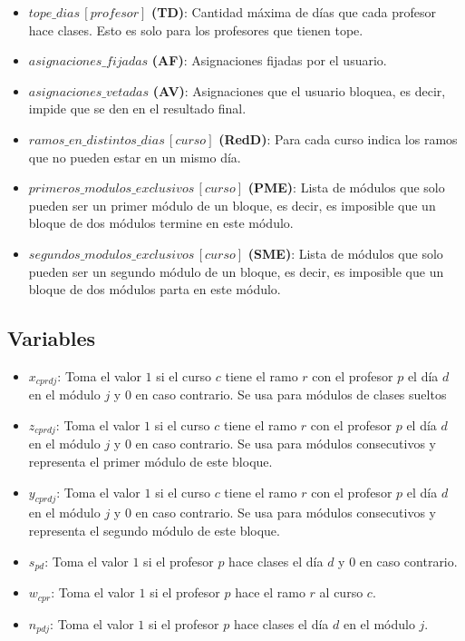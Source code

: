 \documentclass[letterpaper]{article}
\begin{document}
\begin{itemize}
    \item $tope\_dias\,[profesor]$ \textbf{(TD)}: Cantidad máxima de días que cada profesor hace clases. Esto es solo para los profesores que tienen tope.
    \item $asignaciones\_fijadas$ \textbf{(AF)}: Asignaciones fijadas por el usuario.
    \item $asignaciones\_vetadas$ \textbf{(AV)}: Asignaciones que el usuario bloquea, es decir, impide que se den en el resultado final.
    \item $ramos\_en\_distintos\_dias\,[curso]$ \textbf{(RedD)}: Para cada curso indica los ramos que no pueden estar en un mismo día. 
    \item $primeros\_modulos\_exclusivos\,[curso]$ \textbf{(PME)}: Lista de módulos que solo pueden ser un primer módulo de un bloque, es decir, es imposible que un bloque de dos módulos termine en este módulo.
    \item $segundos\_modulos\_exclusivos\,[curso]$ \textbf{(SME)}: Lista de módulos que solo pueden ser un segundo módulo de un bloque, es decir, es imposible que un bloque de dos módulos parta en este módulo.
\end{itemize}

\subsection{Variables}
\begin{itemize}
    \item $x_{cprdj}$: Toma el valor $1$ si el curso $c$ tiene el ramo $r$ con el profesor $p$ el día $d$ en el módulo $j$ y $0$ en caso contrario. Se usa para módulos de clases sueltos
    \item $z_{cprdj}$: Toma el valor $1$ si el curso $c$ tiene el ramo $r$ con el profesor $p$ el día $d$ en el módulo $j$ y $0$ en caso contrario. Se usa para módulos consecutivos y representa el primer módulo de este bloque.
    \item $y_{cprdj}$: Toma el valor $1$ si el curso $c$ tiene el ramo $r$ con el profesor $p$ el día $d$ en el módulo $j$ y $0$ en caso contrario. Se usa para módulos consecutivos y representa el segundo módulo de este bloque.
    \item $s_{pd}$: Toma el valor $1$ si el profesor $p$ hace clases el día $d$ y $0$ en caso contrario.
    \item $w_{cpr}$: Toma el valor $1$ si el profesor $p$ hace el ramo $r$ al curso $c$.
    \item $n_{pdj}$: Toma el valor $1$ si el profesor $p$ hace clases el día $d$ en el módulo $j$.
\end{itemize}
\end{document}

